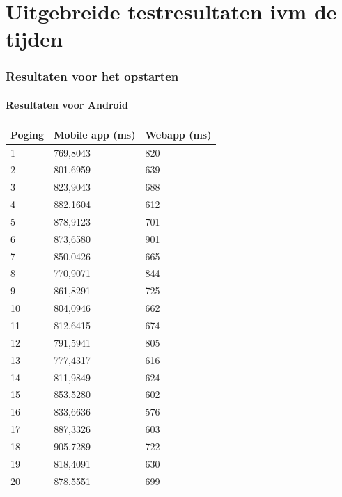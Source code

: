\documentclass[pdftex,a4paper,12pt,twoside]{report}
\begin{document}
\tableofcontents

\appendix

\chapter{Uitgebreide testresultaten ivm de tijden}
\label{ch:uitgebereidresultatenmetbetrekkingtottijden}

\subsection{Resultaten voor het opstarten}
\subsubsection{Resultaten voor Android}
\begin{center}
    \begin{tabular}{ | l | l | l |}
    \hline
    Poging & Mobile app (ms) & Webapp (ms)
      \\ \hline
      1 & 769,8043 & 820
      \\ \hline
      2 & 801,6959 & 639
      \\ \hline
      3 & 823,9043 & 688
      \\ \hline
      4 & 882,1604 & 612
      \\ \hline
      5 & 878,9123 & 701
      \\ \hline
      6 & 873,6580 & 901
      \\ \hline
      7 & 850,0426 & 665
      \\ \hline
      8 & 770,9071 & 844
      \\ \hline
      9 & 861,8291 & 725
      \\ \hline
      10 & 804,0946 & 662
      \\ \hline
      11 & 812,6415 & 674
      \\ \hline
      12 & 791,5941 & 805
      \\ \hline
      13 & 777,4317 & 616
      \\ \hline
      14 & 811,9849 & 624
      \\ \hline
      15 & 853,5280 & 602
      \\ \hline
      16 & 833,6636 & 576
      \\ \hline
      17 & 887,3326 & 603
      \\ \hline
      18 & 905,7289 & 722
      \\ \hline
      19 & 818,4091 & 630
      \\ \hline
      20 & 878,5551 & 699
      \\ \hline
    \end{tabular}
\end{center}
\end{document}
